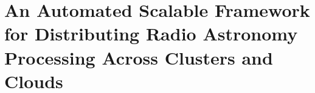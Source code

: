 

\chapter[LOFAR Scalability Framework]{An Automated Scalable Framework for Distributing Radio Astronomy Processing Across Clusters and Clouds}\label{ch:GRID_LRT}



%        

%
%

